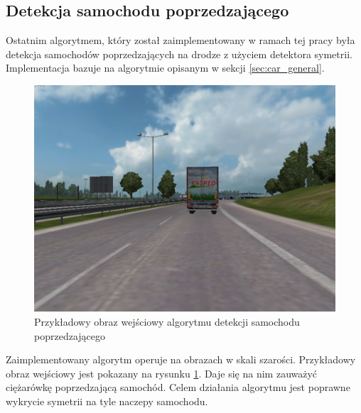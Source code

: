
\subsection{Detekcja samochodu poprzedzającego}
Ostatnim algorytmem, który został zaimplementowany w ramach tej pracy była detekcja samochodów poprzedzających na drodze z użyciem detektora symetrii. 
Implementacja bazuje na algorytmie opisanym w sekcji \ref{sec:car_general}. %

\begin{figure}
  \centering
  \includegraphics[width=13cm]{img/alg3_input.jpg}
  \caption{Przykładowy obraz wejściowy algorytmu detekcji samochodu poprzedzającego}
  \label{fig:alg3_input}
\end{figure}

Zaimplementowany algorytm operuje na obrazach w skali szarości. %
Przykładowy obraz wejściowy jest pokazany na rysunku \ref{fig:alg3_input}. 
Daje się na nim zauważyć ciężarówkę poprzedzającą samochód. 
Celem działania algorytmu jest poprawne wykrycie symetrii na tyle naczepy samochodu.

